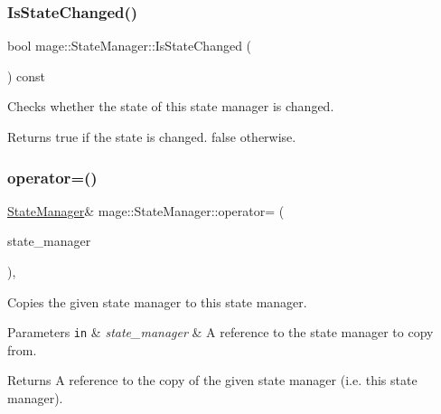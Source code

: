 \subsubsection{\texorpdfstring{Is\+State\+Changed()}{IsStateChanged()}}
{\footnotesize\ttfamily bool mage\+::\+State\+Manager\+::\+Is\+State\+Changed (\begin{DoxyParamCaption}{ }\end{DoxyParamCaption}) const}

Checks whether the state of this state manager is changed.

\begin{DoxyReturn}{Returns}
{\ttfamily true} if the state is changed. {\ttfamily false} otherwise. 
\end{DoxyReturn}
\hypertarget{classmage_1_1_state_manager_a5aaf364d1f40e7d333693d1de42efec3}{}\label{classmage_1_1_state_manager_a5aaf364d1f40e7d333693d1de42efec3} 
\subsubsection{\texorpdfstring{operator=()}{operator=()}}
{\footnotesize\ttfamily \hyperlink{classmage_1_1_state_manager}{State\+Manager}\& mage\+::\+State\+Manager\+::operator= (\begin{DoxyParamCaption}\item[{const \hyperlink{classmage_1_1_state_manager}{State\+Manager} \&}]{state\+\_\+manager }\end{DoxyParamCaption})\hspace{0.3cm}{\ttfamily [private]}, {\ttfamily [delete]}}

Copies the given state manager to this state manager.


\begin{DoxyParams}[1]{Parameters}
\mbox{\tt in}  & {\em state\+\_\+manager} & A reference to the state manager to copy from. \\
\hline
\end{DoxyParams}
\begin{DoxyReturn}{Returns}
A reference to the copy of the given state manager (i.\+e. this state manager). 
\end{DoxyReturn}
\hypertarget{classmage_1_1_state_manager_a956a4250f7d2e8bd95b38f314a3c1f77}{}\label{classmage_1_1_state_manager_a956a4250f7d2e8bd95b38f314a3c1f77} 
